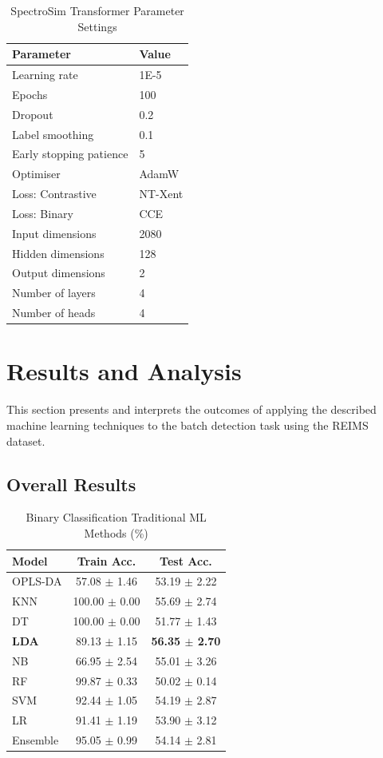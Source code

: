 \begin{table}[h!]
\centering
\caption{SpectroSim Transformer Parameter Settings}
\label{tab:spectrosim_params}
\begin{tabular}{ll}
\toprule
\textbf{Parameter} & \textbf{Value} \\
\midrule
Learning rate & 1E-5 \\
Epochs & 100 \\
Dropout & 0.2 \\
Label smoothing & 0.1 \\
Early stopping patience & 5 \\
Optimiser & AdamW \\
Loss: Contrastive & NT-Xent \\
Loss: Binary & CCE \\
Input dimensions & 2080 \\
Hidden dimensions & 128 \\
Output dimensions & 2 \\
Number of layers & 4 \\
Number of heads & 4 \\
\bottomrule
\end{tabular}
\end{table}

\section{Results and Analysis}

This section presents and interprets the outcomes of applying the described machine learning techniques to the batch detection task using the REIMS dataset.


\subsection{Overall Results}

\begin{table}[H]
    \centering
    \caption{Binary Classification Traditional ML Methods (\%)}
    \label{tab:binary_results_traditional}
    \begin{tabular}{|l|c|c|}
        \hline
        Model & Train Acc. & Test Acc. \\ 
        \hline
        OPLS-DA & 57.08 $\pm$ 1.46 & 53.19 $\pm$ 2.22 \\
        KNN & 100.00 $\pm$ 0.00 & 55.69 $\pm$ 2.74 \\
        DT & 100.00 $\pm$ 0.00 & 51.77 $\pm$ 1.43 \\
        \textbf{LDA} & 89.13 $\pm$ 1.15 & \textbf{56.35 $\pm$ 2.70} \\
        NB & 66.95 $\pm$ 2.54 & 55.01 $\pm$ 3.26 \\
        RF & 99.87 $\pm$ 0.33 & 50.02 $\pm$ 0.14 \\
        SVM & 92.44 $\pm$ 1.05 & 54.19 $\pm$ 2.87 \\
        LR & 91.41 $\pm$ 1.19 & 53.90 $\pm$ 3.12 \\
        Ensemble & 95.05 $\pm$ 0.99 & 54.14 $\pm$ 2.81 \\
        \hline
    \end{tabular}
\end{table}

